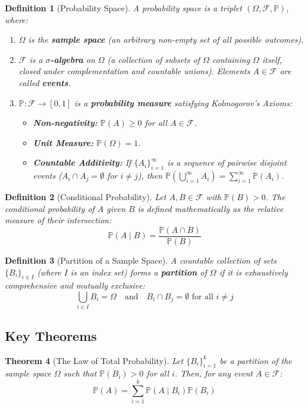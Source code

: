 \documentclass[12pt]{article}
\newtheorem{theorem}{Theorem}[section]
\newtheorem{definition}[theorem]{Definition}
\begin{document}
\begin{definition}[Probability Space]
A probability space is a triplet $(\Omega, \mathcal{F}, \mathbb{P})$, where:
\begin{enumerate}
    \item $\Omega$ is the \textbf{sample space} (an arbitrary non-empty set of all possible outcomes).
    \item $\mathcal{F}$ is a \textbf{$\sigma$-algebra} on $\Omega$ (a collection of subsets of $\Omega$ containing $\Omega$ itself, closed under complementation and countable unions). Elements $A \in \mathcal{F}$ are called \textbf{events}.
    \item $\mathbb{P}: \mathcal{F} \to [0, 1]$ is a \textbf{probability measure} satisfying Kolmogorov's Axioms:
    \begin{itemize}
        \item \textbf{Non-negativity:} $\mathbb{P}(A) \ge 0$ for all $A \in \mathcal{F}$.
        \item \textbf{Unit Measure:} $\mathbb{P}(\Omega) = 1$.
        \item \textbf{Countable Additivity:} If $\{A_i\}_{i=1}^\infty$ is a sequence of pairwise disjoint events ($A_i \cap A_j = \emptyset$ for $i \ne j$), then $\mathbb{P}\left(\bigcup_{i=1}^\infty A_i\right) = \sum_{i=1}^\infty \mathbb{P}(A_i)$.
    \end{itemize}
\end{enumerate}
\end{definition}

\begin{definition}[Conditional Probability]
Let $A, B \in \mathcal{F}$ with $\mathbb{P}(B) > 0$. The conditional probability of $A$ given $B$ is defined mathematically as the relative measure of their intersection:
\[ \mathbb{P}(A \mid B) = \frac{\mathbb{P}(A \cap B)}{\mathbb{P}(B)} \]
\end{definition}

\begin{definition}[Partition of a Sample Space]
A countable collection of sets $\{B_i\}_{i \in I}$ (where $I$ is an index set) forms a \textbf{partition} of $\Omega$ if it is exhaustively comprehensive and mutually exclusive:
\[ \bigcup_{i \in I} B_i = \Omega \quad \text{and} \quad B_i \cap B_j = \emptyset \text{ for all } i \ne j \]
\end{definition}

\subsection{Key Theorems}
\begin{theorem}[The Law of Total Probability]
Let $\{B_i\}_{i=1}^k$ be a partition of the sample space $\Omega$ such that $\mathbb{P}(B_i) > 0$ for all $i$. Then, for any event $A \in \mathcal{F}$:
\[ \mathbb{P}(A) = \sum_{i=1}^k \mathbb{P}(A \mid B_i) \mathbb{P}(B_i) \]
\end{theorem}
\end{document}
